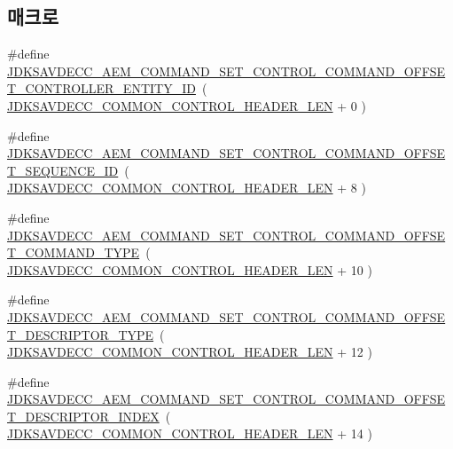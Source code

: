 \subsection*{매크로}
\begin{DoxyCompactItemize}
\item 
\#define \hyperlink{group__command__set__control_ga90bf1669d856de17b2183cfdb1897583}{J\+D\+K\+S\+A\+V\+D\+E\+C\+C\+\_\+\+A\+E\+M\+\_\+\+C\+O\+M\+M\+A\+N\+D\+\_\+\+S\+E\+T\+\_\+\+C\+O\+N\+T\+R\+O\+L\+\_\+\+C\+O\+M\+M\+A\+N\+D\+\_\+\+O\+F\+F\+S\+E\+T\+\_\+\+C\+O\+N\+T\+R\+O\+L\+L\+E\+R\+\_\+\+E\+N\+T\+I\+T\+Y\+\_\+\+ID}~( \hyperlink{group__jdksavdecc__avtp__common__control__header_gaae84052886fb1bb42f3bc5f85b741dff}{J\+D\+K\+S\+A\+V\+D\+E\+C\+C\+\_\+\+C\+O\+M\+M\+O\+N\+\_\+\+C\+O\+N\+T\+R\+O\+L\+\_\+\+H\+E\+A\+D\+E\+R\+\_\+\+L\+EN} + 0 )
\item 
\#define \hyperlink{group__command__set__control_gaab9df116f315d2f1735ffcff55214a2f}{J\+D\+K\+S\+A\+V\+D\+E\+C\+C\+\_\+\+A\+E\+M\+\_\+\+C\+O\+M\+M\+A\+N\+D\+\_\+\+S\+E\+T\+\_\+\+C\+O\+N\+T\+R\+O\+L\+\_\+\+C\+O\+M\+M\+A\+N\+D\+\_\+\+O\+F\+F\+S\+E\+T\+\_\+\+S\+E\+Q\+U\+E\+N\+C\+E\+\_\+\+ID}~( \hyperlink{group__jdksavdecc__avtp__common__control__header_gaae84052886fb1bb42f3bc5f85b741dff}{J\+D\+K\+S\+A\+V\+D\+E\+C\+C\+\_\+\+C\+O\+M\+M\+O\+N\+\_\+\+C\+O\+N\+T\+R\+O\+L\+\_\+\+H\+E\+A\+D\+E\+R\+\_\+\+L\+EN} + 8 )
\item 
\#define \hyperlink{group__command__set__control_gaa0379876489c41e04e084c3fb21b0617}{J\+D\+K\+S\+A\+V\+D\+E\+C\+C\+\_\+\+A\+E\+M\+\_\+\+C\+O\+M\+M\+A\+N\+D\+\_\+\+S\+E\+T\+\_\+\+C\+O\+N\+T\+R\+O\+L\+\_\+\+C\+O\+M\+M\+A\+N\+D\+\_\+\+O\+F\+F\+S\+E\+T\+\_\+\+C\+O\+M\+M\+A\+N\+D\+\_\+\+T\+Y\+PE}~( \hyperlink{group__jdksavdecc__avtp__common__control__header_gaae84052886fb1bb42f3bc5f85b741dff}{J\+D\+K\+S\+A\+V\+D\+E\+C\+C\+\_\+\+C\+O\+M\+M\+O\+N\+\_\+\+C\+O\+N\+T\+R\+O\+L\+\_\+\+H\+E\+A\+D\+E\+R\+\_\+\+L\+EN} + 10 )
\item 
\#define \hyperlink{group__command__set__control_ga7ee5b5f891a008e12e0a7e5542052126}{J\+D\+K\+S\+A\+V\+D\+E\+C\+C\+\_\+\+A\+E\+M\+\_\+\+C\+O\+M\+M\+A\+N\+D\+\_\+\+S\+E\+T\+\_\+\+C\+O\+N\+T\+R\+O\+L\+\_\+\+C\+O\+M\+M\+A\+N\+D\+\_\+\+O\+F\+F\+S\+E\+T\+\_\+\+D\+E\+S\+C\+R\+I\+P\+T\+O\+R\+\_\+\+T\+Y\+PE}~( \hyperlink{group__jdksavdecc__avtp__common__control__header_gaae84052886fb1bb42f3bc5f85b741dff}{J\+D\+K\+S\+A\+V\+D\+E\+C\+C\+\_\+\+C\+O\+M\+M\+O\+N\+\_\+\+C\+O\+N\+T\+R\+O\+L\+\_\+\+H\+E\+A\+D\+E\+R\+\_\+\+L\+EN} + 12 )
\item 
\#define \hyperlink{group__command__set__control_gaf64b3d6887fa5db21a50422df302ec12}{J\+D\+K\+S\+A\+V\+D\+E\+C\+C\+\_\+\+A\+E\+M\+\_\+\+C\+O\+M\+M\+A\+N\+D\+\_\+\+S\+E\+T\+\_\+\+C\+O\+N\+T\+R\+O\+L\+\_\+\+C\+O\+M\+M\+A\+N\+D\+\_\+\+O\+F\+F\+S\+E\+T\+\_\+\+D\+E\+S\+C\+R\+I\+P\+T\+O\+R\+\_\+\+I\+N\+D\+EX}~( \hyperlink{group__jdksavdecc__avtp__common__control__header_gaae84052886fb1bb42f3bc5f85b741dff}{J\+D\+K\+S\+A\+V\+D\+E\+C\+C\+\_\+\+C\+O\+M\+M\+O\+N\+\_\+\+C\+O\+N\+T\+R\+O\+L\+\_\+\+H\+E\+A\+D\+E\+R\+\_\+\+L\+EN} + 14 )

\end{DoxyCompactItemize}
